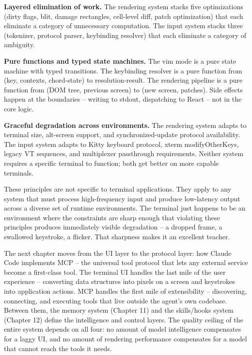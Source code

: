 \documentclass[
  english,
  11pt,
  letterpaper,
]{book}
\begin{document}
\textbf{Layered elimination of work.} The rendering system stacks five
optimizations (dirty flags, blit, damage rectangles, cell-level diff,
patch optimization) that each eliminate a category of unnecessary
computation. The input system stacks three (tokenizer, protocol parser,
keybinding resolver) that each eliminate a category of ambiguity.

\textbf{Pure functions and typed state machines.} The vim mode is a pure
state machine with typed transitions. The keybinding resolver is a pure
function from (key, contexts, chord-state) to resolution-result. The
rendering pipeline is a pure function from (DOM tree, previous screen)
to (new screen, patches). Side effects happen at the boundaries --
writing to stdout, dispatching to React -- not in the core logic.

\textbf{Graceful degradation across environments.} The rendering system
adapts to terminal size, alt-screen support, and synchronized-update
protocol availability. The input system adapts to Kitty keyboard
protocol, xterm modifyOtherKeys, legacy VT sequences, and multiplexer
passthrough requirements. Neither system requires a specific terminal to
function; both get better on more capable terminals.

These principles are not specific to terminal applications. They apply
to any system that must process high-frequency input and produce
low-latency output across a diverse set of runtime environments. The
terminal just happens to be an environment where the constraints are
sharp enough that violating these principles produces immediately
visible degradation -- a dropped frame, a swallowed keystroke, a
flicker. That sharpness makes it an excellent teacher.

The next chapter moves from the UI layer to the protocol layer: how
Claude Code implements MCP -- the universal tool protocol that lets any
external service become a first-class tool. The terminal UI handles the
last mile of the user experience -- converting data structures into
pixels on a screen and keystrokes into application actions. MCP handles
the first mile of extensibility -- discovering, connecting, and
executing tools that live outside the agent's own codebase. Between
them, the memory system (Chapter 11) and the skills/hooks system
(Chapter 12) define the intelligence and control layers. The quality
ceiling of the entire system depends on all four: no amount of model
intelligence compensates for a laggy UI, and no amount of rendering
performance compensates for a model that cannot reach the tools it
needs.
\end{document}
